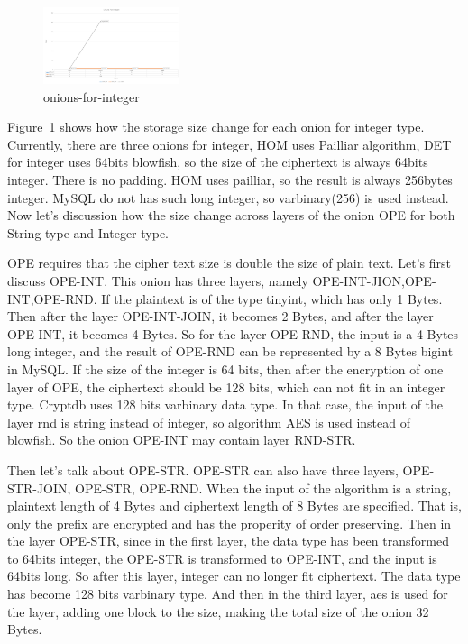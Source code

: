 \begin{figure}[tb]
\centering
\includegraphics[width=4cm]{images/onions-for-integer.png}
\caption{onions-for-integer}
\label{fig:stack6}
\end{figure}


Figure~\ref{fig:stack6} shows how the storage size change for each onion for integer type. Currently, there are three onions for integer, HOM uses Pailliar algorithm, DET for integer uses 64bits blowfish, so the size of the ciphertext is always 64bits integer. There is no padding. HOM uses pailliar, so the result is always 256bytes integer. MySQL do not has such long integer, so varbinary(256) is used instead. Now let's discussion how the size change across layers of the onion OPE for both String type and Integer type. 



OPE requires that the cipher text size is double the size of plain text. Let's first discuss OPE-INT. This onion has three layers, namely OPE-INT-JION,OPE-INT,OPE-RND. If the plaintext is of the type tinyint, which has only 1 Bytes. Then after the layer OPE-INT-JOIN, it becomes 2 Bytes, and after the layer OPE-INT, it becomes 4 Bytes. So for the layer OPE-RND, the input is a 4 Bytes long integer, and the result of OPE-RND can be represented by a 8 Bytes bigint in MySQL. If the size of the integer is 64 bits, then after the encryption of one layer of OPE, the ciphertext should be 128 bits, which can not fit in an integer type. Cryptdb uses 128 bits varbinary data type. In that case, the input of the layer rnd is string instead of integer, so algorithm AES is used instead of blowfish. So the onion OPE-INT may contain layer RND-STR. 

Then let's talk about OPE-STR. OPE-STR can also have three layers, OPE-STR-JOIN, OPE-STR, OPE-RND. When the input of the algorithm is a string, plaintext length of 4 Bytes and  ciphertext length of 8 Bytes are specified. That is, only the prefix are encrypted and has the properity of order preserving. Then in the layer OPE-STR, since in the first layer, the data type has been transformed to 64bits integer, the OPE-STR is transformed to OPE-INT, and the input is 64bits long. So after this layer, integer can no longer fit ciphertext. The data type has become 128 bits varbinary type. And then in the third layer, aes is used for the layer, adding one block to the size, making the total size of the onion 32 Bytes.



